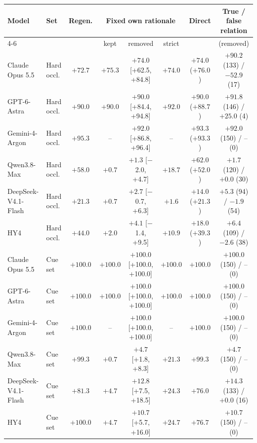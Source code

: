 \begin{tabular}{llcccccc}
\toprule
Model & Set & Regen. & \multicolumn{3}{c}{Fixed own rationale} & Direct & True / false relation \\
\cmidrule(lr){4-6}
 & & & kept & removed & strict & & (removed) \\
\midrule
Claude Opus 5.5 & Hard occl. & $+72.7$ & $+75.3$ & $+74.0$ {\scriptsize[+62.5, +84.8]} & $+74.0$ & $+74.0$ ($+76.0$) & $+90.2$ (133) / $-52.9$ (17) \\
GPT-6-Astra & Hard occl. & $+90.0$ & $+90.0$ & $+90.0$ {\scriptsize[+84.4, +94.8]} & $+92.0$ & $+90.0$ ($+88.7$) & $+91.8$ (146) / $+25.0$ (4) \\
Gemini-4-Argon & Hard occl. & $+95.3$ & -- & $+92.0$ {\scriptsize[+86.8, +96.4]} & -- & $+93.3$ ($+93.3$) & $+92.0$ (150) / -- (0) \\
Qwen3.8-Max & Hard occl. & $+58.0$ & $+0.7$ & $+1.3$ {\scriptsize[$-$2.0, +4.7]} & $+18.7$ & $+62.0$ ($+52.0$) & $+1.7$ (120) / $+0.0$ (30) \\
DeepSeek-V4.1-Flash & Hard occl. & $+21.3$ & $+0.7$ & $+2.7$ {\scriptsize[$-$0.7, +6.3]} & $+1.6$ & $+14.0$ ($+21.3$) & $+5.3$ (94) / $-1.9$ (54) \\
HY4 & Hard occl. & $+44.0$ & $+2.0$ & $+4.1$ {\scriptsize[$-$1.4, +9.5]} & $+10.9$ & $+18.0$ ($+39.3$) & $+6.4$ (109) / $-2.6$ (38) \\
\midrule
Claude Opus 5.5 & Cue set & $+100.0$ & $+100.0$ & $+100.0$ {\scriptsize[+100.0, +100.0]} & $+100.0$ & $+100.0$ & $+100.0$ (150) / -- (0) \\
GPT-6-Astra & Cue set & $+100.0$ & $+100.0$ & $+100.0$ {\scriptsize[+100.0, +100.0]} & $+100.0$ & $+100.0$ & $+100.0$ (150) / -- (0) \\
Gemini-4-Argon & Cue set & $+100.0$ & -- & $+100.0$ {\scriptsize[+100.0, +100.0]} & -- & $+100.0$ & $+100.0$ (150) / -- (0) \\
Qwen3.8-Max & Cue set & $+99.3$ & $+0.7$ & $+4.7$ {\scriptsize[+1.8, +8.3]} & $+21.3$ & $+99.3$ & $+4.7$ (150) / -- (0) \\
DeepSeek-V4.1-Flash & Cue set & $+81.3$ & $+4.7$ & $+12.8$ {\scriptsize[+7.5, +18.5]} & $+24.3$ & $+76.0$ & $+14.3$ (133) / $+0.0$ (16) \\
HY4 & Cue set & $+100.0$ & $+4.7$ & $+10.7$ {\scriptsize[+5.7, +16.0]} & $+24.7$ & $+76.7$ & $+10.7$ (150) / -- (0) \\
\bottomrule
\end{tabular}
